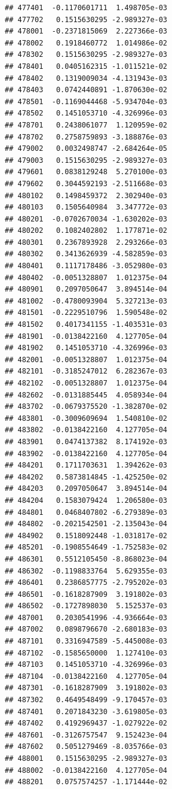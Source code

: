 \documentclass[ignorenonframetext,]{beamer}
\begin{document}
\begin{frame}[fragile]
\begin{verbatim}
## 477401  -0.1170601711  1.498705e-03
## 477702   0.1515630295 -2.989327e-03
## 478001  -0.2371815069  2.227366e-03
## 478002   0.1918460772  1.014986e-02
## 478302   0.1515630295 -2.989327e-03
## 478401   0.0405162315 -1.011521e-02
## 478402   0.1319009034 -4.131943e-03
## 478403   0.0742440891 -1.870630e-02
## 478501  -0.1169044468 -5.934704e-03
## 478502   0.1451053710 -4.326996e-03
## 478701   0.2438061077  1.120959e-02
## 478702   0.2758759893 -3.188876e-03
## 479002   0.0032498747 -2.684264e-05
## 479003   0.1515630295 -2.989327e-03
## 479601   0.0838129248  5.270100e-03
## 479602   0.3044592193 -2.511668e-03
## 480102   0.1498459372  2.302940e-03
## 480103   0.1505640984  3.347772e-03
## 480201  -0.0702670034 -1.630202e-03
## 480202   0.1082402802  1.177871e-02
## 480301   0.2367893928  2.293266e-03
## 480302   0.3413626939 -4.582859e-03
## 480401   0.1117178486 -3.052980e-03
## 480402  -0.0051328807  1.012375e-04
## 480901   0.2097050647  3.894514e-04
## 481002  -0.4780093904  5.327213e-03
## 481501  -0.2229510796  1.590548e-02
## 481502   0.4017341155 -1.403531e-03
## 481901  -0.0138422160  4.127705e-04
## 481902   0.1451053710 -4.326996e-03
## 482001  -0.0051328807  1.012375e-04
## 482101  -0.3185247012  6.282367e-03
## 482102  -0.0051328807  1.012375e-04
## 482602  -0.0131885445  4.058934e-04
## 483702  -0.0679375520 -1.382870e-02
## 483801  -0.3009609694  1.540810e-02
## 483802  -0.0138422160  4.127705e-04
## 483901   0.0474137382  8.174192e-03
## 483902  -0.0138422160  4.127705e-04
## 484201   0.1711703631  1.394262e-03
## 484202   0.5873814845 -1.425250e-02
## 484203   0.2097050647  3.894514e-04
## 484204   0.1583079424  1.206580e-03
## 484801   0.0468407802 -6.279389e-03
## 484802  -0.2021542501 -2.135043e-04
## 484902   0.1518092448 -1.031817e-02
## 485201  -0.1908554649 -1.752583e-02
## 486301   0.5512105450 -8.868023e-04
## 486302  -0.1198833764  5.629355e-03
## 486401   0.2386857775 -2.795202e-03
## 486501  -0.1618287909  3.191802e-03
## 486502  -0.1727898030  5.152537e-03
## 487001   0.2030541996 -4.936664e-03
## 487002   0.0898796670 -2.680183e-03
## 487101   0.3316947589 -5.445008e-03
## 487102  -0.1585650000  1.127410e-03
## 487103   0.1451053710 -4.326996e-03
## 487104  -0.0138422160  4.127705e-04
## 487301  -0.1618287909  3.191802e-03
## 487302   0.4649548499 -9.170457e-03
## 487401   0.2071843230 -3.619805e-03
## 487402   0.4192969437 -1.027922e-02
## 487601  -0.3126757547  9.152423e-04
## 487602   0.5051279469 -8.035766e-03
## 488001   0.1515630295 -2.989327e-03
## 488002  -0.0138422160  4.127705e-04
## 488201   0.0757574257 -1.171444e-02

\end{verbatim}
\end{frame}
\end{document}
